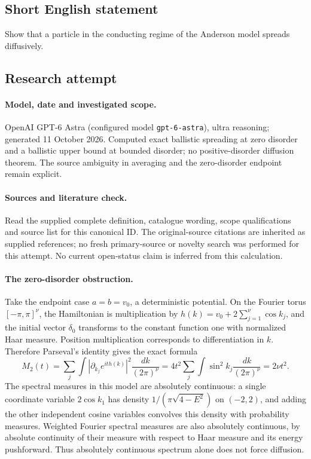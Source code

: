 \documentclass[11pt]{article}
\begin{document}
\subsection{Short English statement}
Show that a particle in the conducting regime of the Anderson model spreads diffusively.
\subsection{Research attempt}
\paragraph{Model, date and investigated scope.}
OpenAI GPT-6 Astra (configured model \texttt{gpt-6-astra}), ultra reasoning; generated 11 October 2026. Computed exact ballistic spreading at zero disorder and a ballistic upper bound at bounded disorder; no positive-disorder diffusion theorem. The source ambiguity in averaging and the zero-disorder endpoint remain explicit.

\paragraph{Sources and literature check.}
Read the supplied complete definition, catalogue wording, scope qualifications and source list for this canonical ID. The original-source citations are inherited as supplied references; no fresh primary-source or novelty search was performed for this attempt. No current open-status claim is inferred from this calculation.

\paragraph{The zero-disorder obstruction.}Take the endpoint case \(a=b=v_0\), a deterministic potential. On the Fourier torus \([-\pi,\pi]^\nu\), the Hamiltonian is multiplication by \(h(k)=v_0+2\sum_{j=1}^\nu\cos k_j\), and the initial vector \(\delta_0\) transforms to the constant function one with normalized Haar measure. Position multiplication corresponds to differentiation in \(k\). Therefore Parseval's identity gives the exact formula
\[M_2(t)=\sum_j\int\left|\partial_{k_j}e^{ith(k)}\right|^2\frac{dk}{(2\pi)^\nu}=4t^2\sum_j\int\sin^2k_j\frac{dk}{(2\pi)^\nu}=2\nu t^2.\]
The spectral measures in this model are absolutely continuous: a single coordinate variable \(2\cos k_1\) has density \(1/(\pi\sqrt{4-E^2})\) on \((-2,2)\), and adding the other independent cosine variables convolves this density with probability measures. Weighted Fourier spectral measures are also absolutely continuous, by absolute continuity of their measure with respect to Haar measure and its energy pushforward. Thus absolutely continuous spectrum alone does not force diffusion.
\end{document}
